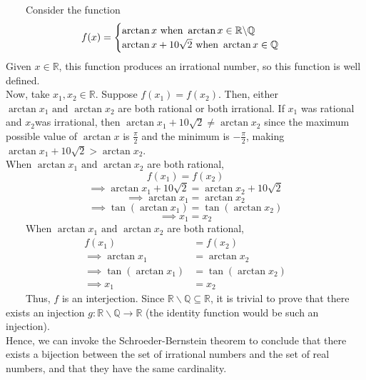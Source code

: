 \documentclass[
]{article}
\begin{document}
~~~~Consider the function
\[f(x) = \begin{cases} \arctan{x} \space \space \space \text{ when } \arctan{x} \in \mathbb{R} \backslash \mathbb{Q} \\ \arctan{x + 10 \sqrt{2}} \space \space \space \text{ when } \arctan{x} \in \mathbb{Q} \end{cases}\]
Given \(x \in \mathbb{R}\), this function produces an irrational number,
so this function is well defined.\\
\hspace*{0.333em}\hspace*{0.333em}\hspace*{0.333em}\hspace*{0.333em}Now,
take \(x_1, x_2 \in \mathbb{R}\). Suppose \(f(x_1) = f(x_2)\). Then,
either \(\arctan{x_1} \text{ and } \arctan{x_2}\) are both rational or
both irrational. If \(x_1\) was rational and \(x_2\)was irrational, then
\(\arctan{x_1}+10\sqrt{2} \neq \arctan{x_2}\) since the maximum possible
value of \(\arctan x\) is \(\frac{\pi}{2}\) and the minimum is
\(-\frac{\pi}{2}\), making \(\arctan{x_1}+10\sqrt{2} > \arctan{x_2}\).\\
\hspace*{0.333em}\hspace*{0.333em}\hspace*{0.333em}\hspace*{0.333em}When
\(\arctan{x_1} \text{ and } \arctan{x_2}\) are both rational,
\[f(x_1) = f(x_2)\]
\[\implies \arctan{x_1}+10\sqrt{2} = \arctan{x_2}+10\sqrt{2}\]
\[\implies \arctan{x_1} = \arctan{x_2}\]
\[\implies \tan(\arctan{x_1}) = \tan(\arctan{x_2})\]
\[\implies x_1 = x_2\] ~~~~When
\(\arctan{x_1} \text{ and } \arctan{x_2}\) are both rational,
\[ \begin{aligned} f(x_1) &= f(x_2) \\
\implies \arctan{x_1} &= \arctan{x_2} \\
\implies \tan(\arctan{x_1}) &= \tan(\arctan{x_2}) \\
\implies x_1 &= x_2 \end{aligned} \] ~~~~Thus, \(f\) is an interjection.
Since \(\mathbb{R} \backslash \mathbb{Q} \subseteq \mathbb{R}\), it is
trivial to prove that there exists an injection
\(g: \mathbb{R} \backslash \mathbb{Q} \to \mathbb{R}\) (the identity
function would be such an injection).\\
\hspace*{0.333em}\hspace*{0.333em}\hspace*{0.333em}\hspace*{0.333em}Hence,
we can invoke the Schroeder-Bernstein theorem to conclude that there
exists a bijection between the set of irrational numbers and the set of
real numbers, and that they have the same cardinality.
\end{document}
